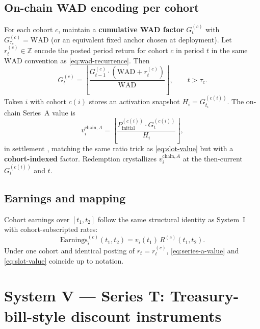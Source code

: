 \documentclass[11pt,a4paper]{article}
\newcommand{\WAD}{\mathrm{WAD}}
\newcommand{\minor}{\text{minor units}}
\begin{document}
\subsection{On-chain WAD encoding per cohort}

For each cohort $c$, maintain a \textbf{cumulative WAD factor} $G^{(c)}_t$ with $G^{(c)}_{\tau_c} = \WAD$ (or an equivalent fixed anchor chosen at deployment). Let $r^{(c)}_t \in \mathbb{Z}$ encode the posted period return for cohort $c$ in period $t$ in the same $\WAD$ convention as \eqref{eq:wad-recurrence}. Then
\begin{equation}
\label{eq:series-a-wad-recurrence}
G^{(c)}_{t} = \left\lfloor \frac{G^{(c)}_{t-1} \cdot (\WAD + r^{(c)}_t)}{\WAD} \right\rfloor,
\qquad t > \tau_c .
\end{equation}
Token $i$ with cohort $c(i)$ stores an activation snapshot $H_i = G^{(c(i))}_{t_i}$. The on-chain Series~A value is
\begin{equation}
\label{eq:series-a-value}
v_i^{\mathrm{chain},A} = \left\lfloor \frac{P^{(c(i))}_{\mathrm{initial}} \cdot G^{(c(i))}_t}{H_i} \right\rfloor,
\end{equation}
in settlement \minor, matching the same ratio trick as \eqref{eq:slot-value} but with a \textbf{cohort-indexed} factor. Redemption crystallizes $v_i^{\mathrm{chain},A}$ at the then-current $G^{(c(i))}_t$ and $t$.

\subsection{Earnings and mapping}

Cohort earnings over $[t_1,t_2]$ follow the same structural identity as System~I with cohort-subscripted rates:
\begin{equation}
\mathrm{Earnings}^{(c)}_i(t_1,t_2) = v_i(t_1)\, R^{(c)}(t_1,t_2).
\end{equation}
Under one cohort and identical posting of $r_t = r^{(c)}_t$, \eqref{eq:series-a-value} and \eqref{eq:slot-value} coincide up to notation.

\section{System V --- Series T: Treasury-bill-style discount instruments}
\label{sec:series-t}
\end{document}
